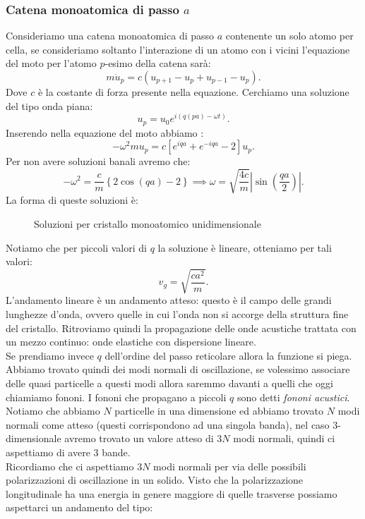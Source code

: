 \subsubsection{Catena monoatomica di passo $a$}
\label{subsec:Catena monoatomica di passo $a$}
Consideriamo una catena monoatomica di passo $a$ contenente un solo atomo per cella, se consideriamo soltanto l'interazione di un atomo con i vicini l'equazione del moto per l'atomo $p$-esimo della catena sarà:
\[
	m \ddot{u}_p 
	=
	c\left( u_{p+1} -u_{p} + u_{p-1} - u_{p} \right) 
.\] 
Dove $c$ è la costante di forza presente nella equazione.
Cerchiamo una soluzione del tipo onda piana:
\[
	u_p = u_0 e^{i\left( q \left( pa \right)  -\omega t \right) }
.\] 
Inserendo nella equazione del moto abbiamo :
\[
	-\omega ^2 m u_p 
	=
	c\left[ e^{iqa} + e^{-iqa} - 2 \right] u_p
.\] 
Per non avere soluzioni banali avremo che:
\[
	-\omega ^2 = \frac{c}{m}\left\{ 2\cos(qa) - 2 \right\} 
	\implies
	\omega  = \sqrt{\frac{4c}{m}} \left| \sin\left( \frac{qa}{2} \right)  \right| 
.\] 
La forma di queste soluzioni è:
\begin{figure}[H]
    \centering
    \caption{Soluzioni per cristallo monoatomico unidimensionale}
    \label{fig:soluzioni-per-cristallo-monoatomico-unidimensionale}
\end{figure}
\noindent
Notiamo che per piccoli valori di $q$ la soluzione è lineare, otteniamo per tali valori:
\[
	v_g = \sqrt{\frac{ca^2}{m}} 
.\] 
L'andamento lineare è un andamento atteso: questo è il campo delle grandi lunghezze d'onda, ovvero quelle in cui l'onda non si accorge della struttura fine del cristallo. Ritroviamo quindi la propagazione delle onde acustiche trattata con un mezzo continuo: onde elastiche con dispersione lineare.\\
Se prendiamo invece $q$ dell'ordine del passo reticolare allora la funzione si piega. \\
Abbiamo trovato quindi dei modi normali di oscillazione, se volessimo associare delle quasi particelle a questi modi allora saremmo davanti a quelli che oggi chiamiamo fononi. I fononi che propagano a piccoli $q$ sono detti \textit{fononi acustici}.\\
Notiamo che abbiamo $N$ particelle in una dimensione ed abbiamo trovato $N$ modi normali come atteso (questi corrispondono ad una singola banda), nel caso 3-dimensionale avremo trovato un valore atteso di  $3N$ modi normali, quindi ci aspettiamo di avere 3 bande.\\
Ricordiamo che ci aspettiamo $3N$ modi normali per via delle possibili polarizzazioni di oscillazione in un solido. Visto che la polarizzazione longitudinale ha una energia in genere maggiore di quelle trasverse possiamo aspettarci un andamento del tipo:
